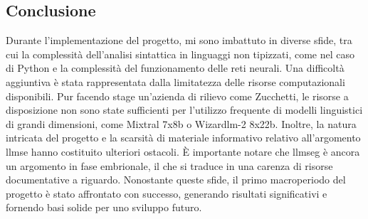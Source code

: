     \subsection{Conclusione}
        Durante l'implementazione del progetto, mi sono imbattuto in diverse sfide, tra cui la complessità dell'analisi sintattica in linguaggi non tipizzati, 
        come nel caso di Python e la complessità del funzionamento delle reti neurali. Una difficoltà aggiuntiva è stata rappresentata dalla limitatezza delle risorse computazionali disponibili. 
        Pur facendo stage un'azienda di rilievo come Zucchetti, le risorse a disposizione non sono state sufficienti per l'utilizzo frequente di modelli linguistici di grandi dimensioni, 
        come Mixtral 7x8b o Wizardlm-2 8x22b. Inoltre, la natura intricata del progetto e la scarsità di materiale informativo relativo all'argomento \gls{llmse} hanno costituito ulteriori ostacoli. 
        È importante notare che \gls{llmseg} è ancora un argomento in fase embrionale, il che si traduce in una carenza di risorse documentative a riguardo. Nonostante queste sfide, 
        il primo macroperiodo del progetto è stato affrontato con successo, generando risultati significativi e fornendo basi solide per uno sviluppo futuro.